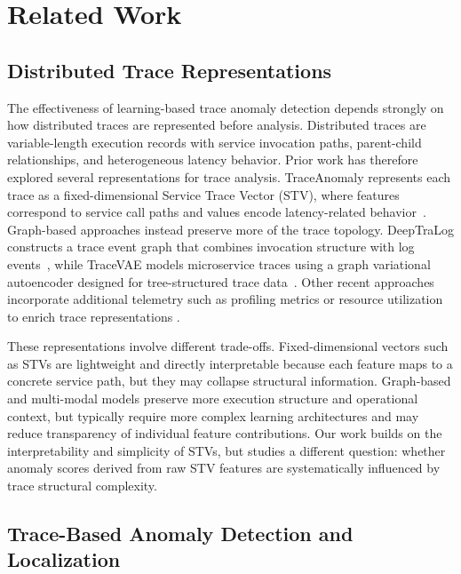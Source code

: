 \section{Related Work}
\label{sec:related-work}

\subsection{Distributed Trace Representations}

The effectiveness of learning-based trace anomaly detection depends
strongly on how distributed traces are represented before analysis.
Distributed traces are variable-length execution records with service
invocation paths, parent-child relationships, and heterogeneous latency
behavior. Prior work has therefore explored several representations for
trace analysis. TraceAnomaly represents each trace as a fixed-dimensional
Service Trace Vector (STV), where features correspond to service call
paths and values encode latency-related behavior~\cite{liu2020traceanomaly}.
Graph-based approaches instead preserve more of the trace topology.
DeepTraLog constructs a trace event graph that combines invocation
structure with log events~\cite{zhang2022deeptralog}, while TraceVAE
models microservice traces using a graph variational autoencoder
designed for tree-structured trace data~\cite{xie2023tracevae}. Other
recent approaches incorporate additional telemetry such as profiling
metrics or resource utilization to enrich trace representations
\cite{panahandeh2024serviceanomaly,alomari2025contextaware}.

These representations involve different trade-offs. Fixed-dimensional
vectors such as STVs are lightweight and directly interpretable because
each feature maps to a concrete service path, but they may collapse
structural information. Graph-based and multi-modal models preserve more
execution structure and operational context, but typically require more
complex learning architectures and may reduce transparency of individual
feature contributions. Our work builds on the interpretability and
simplicity of STVs, but studies a different question: whether anomaly
scores derived from raw STV features are systematically influenced by
trace structural complexity.

\subsection{Trace-Based Anomaly Detection and Localization}

